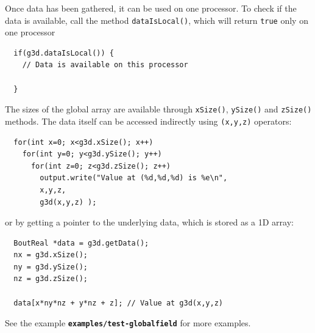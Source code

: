 \documentclass[12pt]{article}
\newcommand{\file}[1]{\texttt{\bf #1}}
\begin{document}
Once data has been gathered, it can be used on one processor. To check if the
data is available, call the method
%
\lstinline!dataIsLocal()!, which will return \lstinline!true!
%
 only on one processor
%
\begin{lstlisting}
  if(g3d.dataIsLocal()) {
    // Data is available on this processor

  }
\end{lstlisting}
%
The sizes of the global array are available through
%
\lstinline!xSize()!, \lstinline!ySize()! and \lstinline!zSize()!
%
methods. The data itself can be accessed indirectly using
%
\lstinline!(x,y,z)!
%
 operators:
%
\begin{lstlisting}
  for(int x=0; x<g3d.xSize(); x++)
    for(int y=0; y<g3d.ySize(); y++)
      for(int z=0; z<g3d.zSize(); z++)
        output.write("Value at (%d,%d,%d) is %e\n",
        x,y,z,
        g3d(x,y,z) );
\end{lstlisting}
%
or by getting a pointer to the underlying data, which is stored as a 1D array:
%
\begin{lstlisting}
  BoutReal *data = g3d.getData();
  nx = g3d.xSize();
  ny = g3d.ySize();
  nz = g3d.zSize();

  data[x*ny*nz + y*nz + z]; // Value at g3d(x,y,z)
\end{lstlisting}
%
See the example \file{examples/test-globalfield} for more examples.
\end{document}
